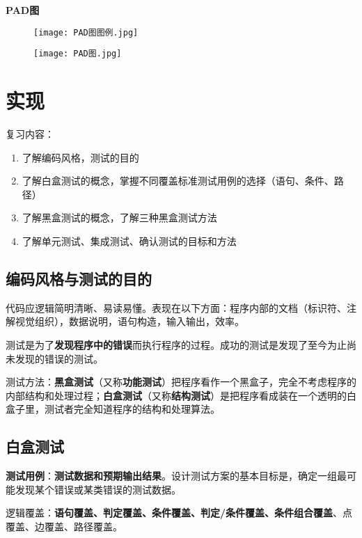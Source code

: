 \documentclass[cn, blue, normal, 12pt]{elegantnote}
\begin{document}
\textbf{PAD图}

\begin{figure}[htbp]
    \centering
    \texttt{[image: PAD图图例.jpg]}
\end{figure}

\begin{figure}[htbp]
    \centering
    \texttt{[image: PAD图.jpg]}
\end{figure}

\section{实现}

复习内容：

\begin{enumerate}
    \item 了解编码风格，测试的目的
    \item 了解白盒测试的概念，掌握不同覆盖标准测试用例的选择（语句、条件、路径）
    \item 了解黑盒测试的概念，了解三种黑盒测试方法
    \item 了解单元测试、集成测试、确认测试的目标和方法
\end{enumerate}

\subsection{编码风格与测试的目的}

代码应逻辑简明清晰、易读易懂。表现在以下方面：程序内部的文档（标识符、注解视觉组织），数据说明，语句构造，输入输出，效率。

测试是为了\textbf{发现程序中的错误}而执行程序的过程。成功的测试是发现了至今为止尚未发现的错误的测试。

测试方法：\textbf{黑盒测试}（又称\textbf{功能测试}）把程序看作一个黑盒子，完全不考虑程序的内部结构和处理过程；\textbf{白盒测试}（又称\textbf{结构测试}）是把程序看成装在一个透明的白盒子里，测试者完全知道程序的结构和处理算法。

\subsection{白盒测试}

\textbf{测试用例}：\textbf{测试数据和预期输出结果}。设计测试方案的基本目标是，确定一组最可能发现某个错误或某类错误的测试数据。

逻辑覆盖：\textbf{语句覆盖、判定覆盖、条件覆盖、判定/条件覆盖、条件组合覆盖}、点覆盖、边覆盖、路径覆盖。
\end{document}
